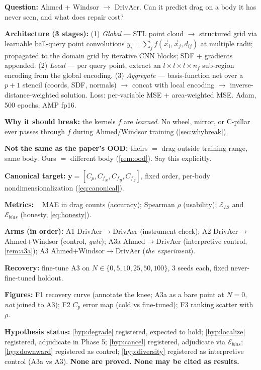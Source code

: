 \documentclass[10pt,a4paper]{article}
\theoremstyle{definition}
\DeclareMathOperator{\Cd}{C_d}
\newcommand{\Cp}{{C_p}}
\newcommand{\Cf}{{C_f}}
\begin{document}
\textbf{Question:} Ahmed + Windsor $\to$ DrivAer. Can it predict drag on a body it
has never seen, and what does repair cost?

\textbf{Architecture (3 stages):} (1) \emph{Global} --- STL point cloud $\to$ structured
grid via learnable ball-query point convolutions $y_i = \sum_j f(\vec{x}_i, \vec{x}_j,
d_{ij})$ at multiple radii; propagated to the domain grid by iterative CNN blocks;
SDF + gradients appended. (2) \emph{Local} --- per query point, extract an
$l\times l\times l\times n_f$ sub-region encoding from the global encoding. (3)
\emph{Aggregate} --- basis-function net over a $p+1$ stencil (coords, SDF, normals)
$\to$ concat with local encoding $\to$ inverse-distance-weighted solution.
Loss: per-variable MSE + area-weighted MSE. Adam, 500 epochs, AMP fp16.

\textbf{Why it should break:} the kernels $f$ are \emph{learned}. No wheel, mirror, or
C-pillar ever passes through $f$ during Ahmed/Windsor training
(\cref{sec:whybreak}).

\textbf{Not the same as the paper's OOD:} theirs $=$ drag outside training range, same
body. Ours $=$ different body (\cref{rem:ood}). Say this explicitly.

\textbf{Canonical target:} $\mathbf{y} = [\Cp, \Cf_x, \Cf_y, \Cf_z]$, fixed order,
per-body nondimensionalization (\cref{eq:canonical}).

\textbf{Metrics:} $\Cd$ MAE in drag counts (accuracy); Spearman $\rho$ (usability);
$\mathcal{E}_{L2}$ and $\mathcal{E}_{bias}$ (honesty, \cref{eq:honesty}).

\textbf{Arms (in order):} A1 DrivAer$\to$DrivAer (instrument check); A2
DrivAer$\to$Ahmed+Windsor (control, \emph{gate}); A3a Ahmed$\to$DrivAer (interpretive
control, \cref{rem:a3a}); A3 Ahmed+Windsor$\to$DrivAer (\emph{the experiment}).

\textbf{Recovery:} fine-tune A3 on $N \in \{0,5,10,25,50,100\}$, 3 seeds each, fixed
never-fine-tuned holdout.

\textbf{Figures:} F1 recovery curve (annotate the knee; A3a as a bare point at $N{=}0$,
\emph{not} joined to A3); F2 $\Cp$ error map (cold vs fine-tuned); F3 ranking scatter
with $\rho$.

\textbf{Hypothesis status:} \cref{hyp:degrade} registered, expected to hold;
\cref{hyp:localize} registered, adjudicate in Phase 5; \cref{hyp:cancel} registered,
adjudicate via $\mathcal{E}_{bias}$; \cref{hyp:downward} registered as control;
\cref{hyp:diversity} registered as interpretive control (A3a vs A3).
\textbf{None are proved. None may be cited as results.}
\end{document}
